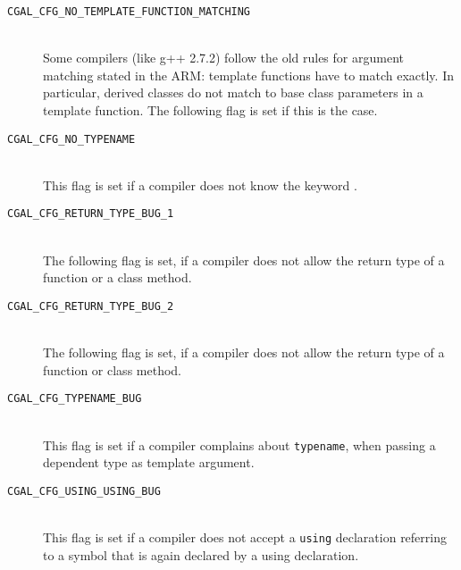 \begin{description}
\item[{\tt CGAL\_CFG\_NO\_TEMPLATE\_FUNCTION\_MATCHING}]~\\
  Some compilers (like g++ 2.7.2) follow the old rules for argument
  matching stated in the ARM: template functions have to match
  exactly. In particular, derived classes do not match to base class
  parameters in a template function. The following flag is set if this
  is the case.

\item[{\tt CGAL\_CFG\_NO\_TYPENAME}]~\\
  This flag is set if a compiler does not know the keyword
  .

\item[{\tt CGAL\_CFG\_RETURN\_TYPE\_BUG\_1}]~\\
  The following flag is set, if a compiler does not allow the return
  type  of a function or a class method.

\item[{\tt CGAL\_CFG\_RETURN\_TYPE\_BUG\_2}]~\\
  The following flag is set, if a compiler does not allow the return
  type  of a function or class method.

\item[{\tt CGAL\_CFG\_TYPENAME\_BUG}]~\\
 This flag is set if a compiler complains about {\tt typename}, when
 passing a dependent type as template argument.

\item[{\tt CGAL\_CFG\_USING\_USING\_BUG}]~\\
 This flag is set if a compiler does not accept a \texttt{using}
 declaration referring to a symbol that is again declared by a using
 declaration.

\end{description}


